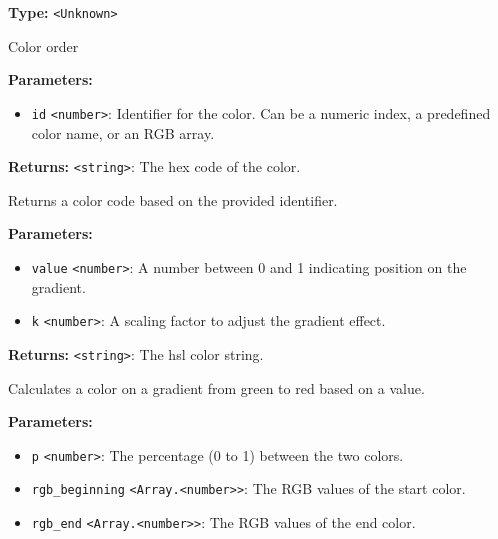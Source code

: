 \documentclass[12pt,a4paper]{article}
\begin{document}
\noindent \textbf{Type:} \texttt{<Unknown>}

\noindent Color order

\vspace{5mm}
\noindent {}


\noindent \textbf{Parameters:}
\begin{itemize}
  \item \texttt{id} \texttt{<number>}: Identifier for the color. Can be a numeric index, a predefined color name, or an RGB array.
\end{itemize}

\noindent \textbf{Returns:} \texttt{<string>}: The hex code of the color.

\noindent Returns a color code based on the provided identifier.

\vspace{5mm}
\noindent {}


\noindent \textbf{Parameters:}
\begin{itemize}
  \item \texttt{value} \texttt{<number>}: A number between 0 and 1 indicating position on the gradient.
  \item \texttt{k} \texttt{<number>}: A scaling factor to adjust the gradient effect.
\end{itemize}

\noindent \textbf{Returns:} \texttt{<string>}: The hsl color string.

\noindent Calculates a color on a gradient from green to red based on a value.

\vspace{5mm}
\noindent {}


\noindent \textbf{Parameters:}
\begin{itemize}
  \item \texttt{p} \texttt{<number>}: The percentage (0 to 1) between the two colors.
  \item \texttt{rgb\_beginning} \texttt{<Array.<number>>}: The RGB values of the start color.
  \item \texttt{rgb\_end} \texttt{<Array.<number>>}: The RGB values of the end color.
\end{itemize}
\end{document}
